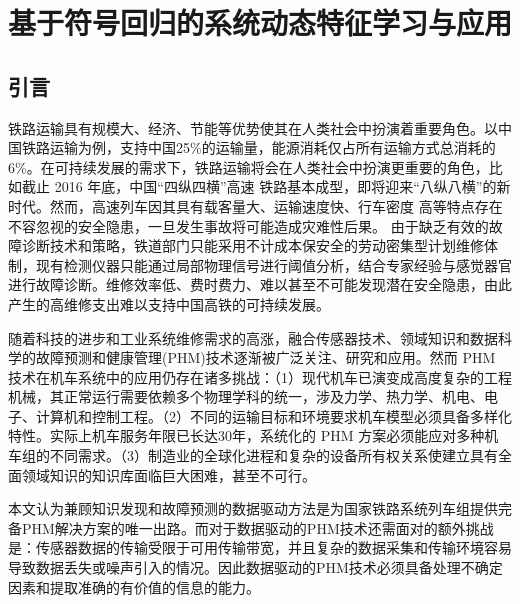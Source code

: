 
\chapter{基于符号回归的系统动态特征学习与应用}
\label{chap:symbolic-regression}

\section{引言}
\label{sec:sr-intro}
铁路运输具有规模大、经济、节能等优势使其在人类社会中扮演着重要角色。以中国铁路运输为例，支持中国25\%的运输量，能源消耗仅占所有运输方式总消耗的6\%\cite{2015年交通运输行业发展统计公报}。在可持续发展的需求下，铁路运输将会在人类社会中扮演更重要的角色，比如截止 2016 年底，中国“四纵四横”高速 铁路基本成型，即将迎来“八纵八横”的新时代\cite{中长期铁路网规划}。然而，高速列车因其具有载客量大、运输速度快、行车密度 高等特点存在不容忽视的安全隐患，一旦发生事故将可能造成灾难性后果。 由于缺乏有效的故障诊断技术和策略，铁道部门只能采用不计成本保安全的劳动密集型计划维修体制，现有检测仪器只能通过局部物理信号进行阈值分析，结合专家经验与感觉器官进行故障诊断。维修效率低、费时费力、难以甚至不可能发现潜在安全隐患，由此产生的高维修支出难以支持中国高铁的可持续发展。

随着科技的进步和工业系统维修需求的高涨，融合传感器技术、领域知识和数据科学的故障预测和健康管理(PHM)技术逐渐被广泛关注、研究和应用\cite{lee2014prognostics,彭宇2010故障预测与健康管理技术综述}。然而 PHM 技术在机车系统中的应用仍存在诸多挑战：（1）现代机车已演变成高度复杂的工程机械，其正常运行需要依赖多个物理学科的统一，涉及力学、热力学、机电、电子、计算机和控制工程。（2）不同的运输目标和环境要求机车模型必须具备多样化特性。实际上机车服务年限已长达30年，系统化的 PHM 方案必须能应对多种机车组的不同需求。（3）制造业的全球化进程和复杂的设备所有权关系使建立具有全面领域知识的知识库面临巨大困难，甚至不可行。

本文认为兼顾知识发现和故障预测的数据驱动方法是为国家铁路系统列车组提供完备PHM解决方案的唯一出路\cite{tsui2015prognostics, esling2012time, gaber2005mining, si2011remaining}。而对于数据驱动的PHM技术还需面对的额外挑战是：传感器数据的传输受限于可用传输带宽，并且复杂的数据采集和传输环境容易导致数据丢失或噪声引入的情况。因此数据驱动的PHM技术必须具备处理不确定因素和提取准确的有价值的信息的能力。

